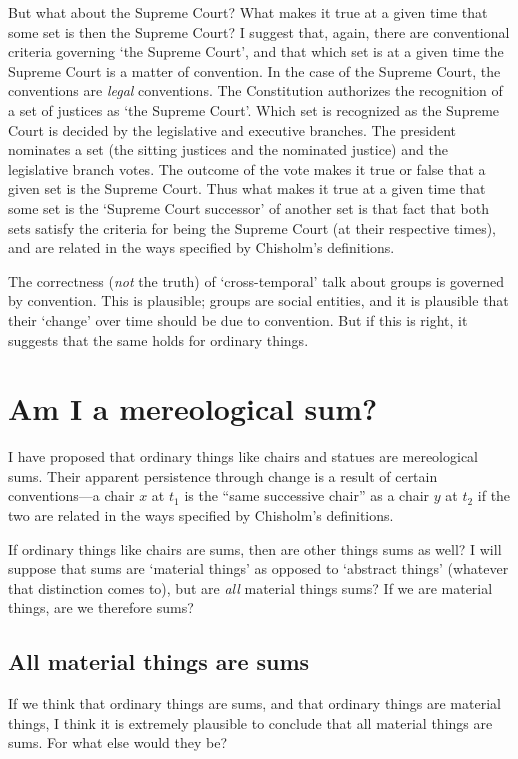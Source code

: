 \documentclass[11pt]{article}
\begin{document}
\begin{spacing}{1.5}

But what about the Supreme Court?  What makes it true at a given time
that some set is then the Supreme Court?  I suggest that, again, there
are conventional criteria governing `the Supreme Court', and that
which set is at a given time the Supreme Court is a matter of
convention.  In the case of the Supreme Court, the conventions are
{\em legal} conventions.  The Constitution authorizes the recognition
of a set of justices as `the Supreme Court'.  Which set is recognized
as the Supreme Court is decided by the legislative and executive
branches.  The president nominates a set (the sitting justices and the
nominated justice) and the legislative branch votes.  The outcome of
the vote makes it true or false that a given set is the Supreme Court.
Thus what makes it true at a given time that some set is the `Supreme
Court successor' of another set is that fact that both sets satisfy
the criteria for being the Supreme Court (at their respective times),
and are related in the ways specified by Chisholm's definitions.


The correctness ({\em not} the truth) of `cross-temporal' talk about
groups is governed by convention.  This is plausible; groups are
social entities, and it is plausible that their `change' over time
should be due to convention.  But if this is right, it suggests that
the same holds for ordinary things.

\section{Am I a mereological sum?}
\label{i-sum}
I have proposed that ordinary things like chairs and statues are
mereological sums.  Their apparent persistence through change is a
result of certain conventions---a chair $x$ at $t_1$ is the ``same
successive chair'' as a chair $y$ at $t_2$ if the two are related in
the ways specified by Chisholm's definitions.

If ordinary things like chairs are sums, then are other things sums as
well?  I will suppose that sums are `material things' as opposed to
`abstract things' (whatever that distinction comes to), but are {\em
  all} material things sums?  If we are material things, are we
therefore sums?

\subsection{All material things are sums}
\label{material-sum}
If we think that ordinary things are sums, and that ordinary things
are material things, I think it is extremely plausible to conclude
that all material things are sums.  For what else would they be?


\end{spacing}
\end{document}
